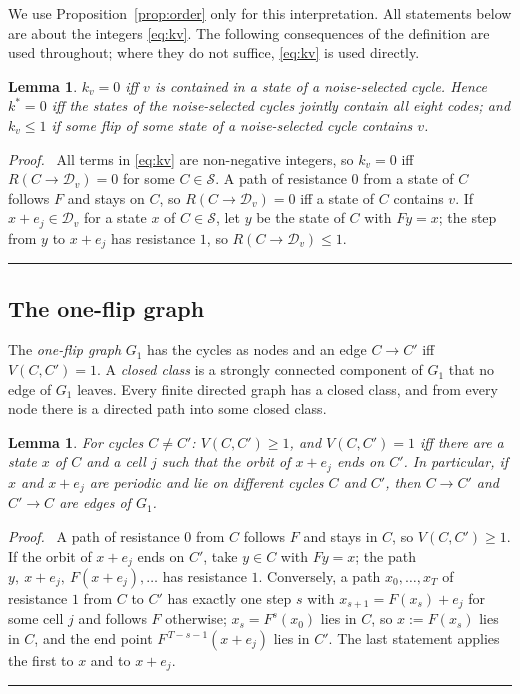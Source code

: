 \documentclass[10pt,a4paper]{article}
\newtheorem{lemma}[theorem]{Lemma}
\newcommand{\qedmark}{\rule{1.1ex}{1.1ex}}
\newenvironment{proof}[1][Proof]{\par\smallskip\noindent\textit{#1.}\ }{\hfill\qedmark\par\smallskip}
\newcommand{\Sel}{\mathcal{S}}                %
\newcommand{\Gone}{G_1}                       %
\newcommand{\Dc}[1]{\mathcal{D}_{#1}}         %
\newcommand{\kst}{k^{*}}
\begin{document}
We use Proposition~\ref{prop:order} only for this interpretation. All statements below are about the integers
\eqref{eq:kv}. The following consequences of the definition are used throughout; where they do not suffice,
\eqref{eq:kv} is used directly.

\begin{lemma}\label{lem:kzero}
$k_v=0$ iff $v$ is contained in a state of a noise-selected cycle. Hence $\kst=0$ iff the states of the noise-selected
cycles jointly contain all eight codes; and $k_v\le1$ if some flip of some state of a noise-selected cycle contains $v$.
\end{lemma}
\begin{proof}
All terms in \eqref{eq:kv} are non-negative integers, so $k_v=0$ iff $R(C\to\Dc{v})=0$ for some $C\in\Sel$. A path of
resistance $0$ from a state of $C$ follows $F$ and stays on $C$, so $R(C\to\Dc{v})=0$ iff a state of $C$ contains $v$.
If $x+e_j\in\Dc{v}$ for a state $x$ of $C\in\Sel$, let $y$ be the state of $C$ with $Fy=x$; the step from $y$ to
$x+e_j$ has resistance $1$, so $R(C\to\Dc{v})\le1$.
\end{proof}

\subsection{The one-flip graph}\label{sec:g1}
The \emph{one-flip graph} $\Gone$ has the cycles as nodes and an edge $C\to C'$ iff $V(C,C')=1$. A \emph{closed class}
is a strongly connected component of $\Gone$ that no edge of $\Gone$ leaves. Every finite directed graph has a closed
class, and from every node there is a directed path into some closed class.

\begin{lemma}\label{lem:edge}
For cycles $C\ne C'$: $V(C,C')\ge1$, and $V(C,C')=1$ iff there are a state $x$ of $C$ and a cell $j$ such that the
orbit of $x+e_j$ ends on $C'$. In particular, if $x$ and $x+e_j$ are periodic and lie on different cycles $C$ and $C'$,
then $C\to C'$ and $C'\to C$ are edges of $\Gone$.
\end{lemma}
\begin{proof}
A path of resistance $0$ from $C$ follows $F$ and stays in $C$, so $V(C,C')\ge1$. If the orbit of $x+e_j$ ends on $C'$,
take $y\in C$ with $Fy=x$; the path $y,\ x+e_j,\ F(x+e_j),\dots$ has resistance $1$. Conversely, a path
$x_0,\dots,x_T$ of resistance $1$ from $C$ to $C'$ has exactly one step $s$ with $x_{s+1}=F(x_s)+e_j$ for some cell
$j$ and follows $F$ otherwise; $x_s=F^s(x_0)$ lies in $C$, so $x:=F(x_s)$ lies in $C$, and the end point
$F^{\,T-s-1}(x+e_j)$ lies in $C'$. The last statement applies the first to $x$ and to $x+e_j$.
\end{proof}
\end{document}
